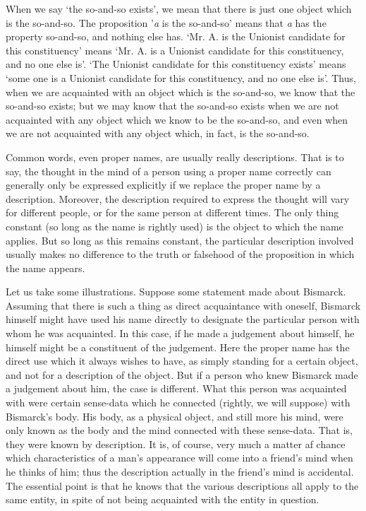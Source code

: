 \documentclass[oneside,letterpaper,12pt]{book}
\begin{document}
When we say `the so-and-so exists', we
mean that there is just one object which is the so-and-so. The
proposition '\emph{a} is the
so-and-so' means that \emph{a} has the property
so-and-so, and nothing else has. `Mr. A. is the Unionist
candidate for this constituency' means
`Mr. A. is a Unionist candidate for this constituency,
and no one else is'. `The Unionist
candidate for this constituency exists' means
`some one is a Unionist candidate for this constituency,
and no one else is'. Thus, when we are acquainted with an
object which is the so-and-so, we know that the so-and-so exists; but we
may know that the so-and-so exists when we are not acquainted with any
object which we know to be the so-and-so, and even when we are not
acquainted with any object which, in fact, is the so-and-so.

Common words, even proper names, are usually really descriptions. That
is to say, the thought in the mind of a person using a proper name
correctly can generally only be expressed explicitly if we replace the
proper name by a description. Moreover, the description required to
express the thought will vary for different people, or for the same
person at different times. The only thing constant (so long as the name
is rightly used) is the object to which the name applies. But so long as
this remains constant, the particular description involved usually makes
no difference to the truth or falsehood of the proposition in which the
name appears.

Let us take some illustrations. Suppose some statement made about
Bismarck. Assuming that there is such a thing as direct acquaintance
with oneself, Bismarck himself might have used his name directly to
designate the particular person with whom he was acquainted. In this
case, if he made a judgement about himself, he himself might be a
constituent of the judgement. Here the proper name has the direct use
which it always wishes to have, as simply standing for a certain object,
and not for a description of the object. But if a person who knew
Bismarck made a judgement about him, the case is different. What this
person was acquainted with were certain sense-data which he connected
(rightly, we will suppose) with Bismarck's body. His
body, as a physical object, and still more his mind, were only known as
the body and the mind connected with these sense-data. That is, they
were known by description. It is, of course, very much a matter af
chance which characteristics of a man's appearance will
come into a friend's mind when he thinks of him; thus
the description actually in the friend's mind is
accidental. The essential point is that he knows that the various
descriptions all apply to the same entity, in spite of not being
acquainted with the entity in question.
\end{document}
